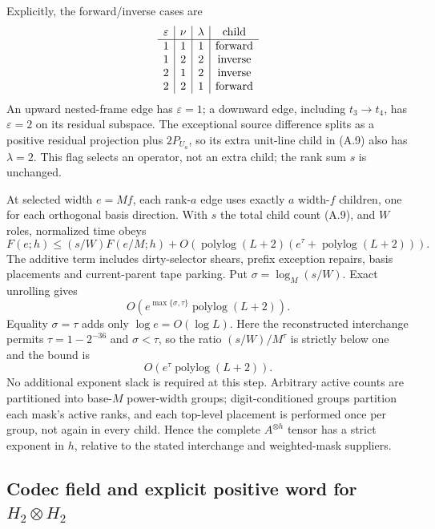 Explicitly, the forward/inverse cases are
\[
\begin{array}{c|c|c|c}
 \varepsilon&\nu&\lambda&\hbox{child}\\ \hline
 1&1&1&\hbox{forward}\\
 1&2&2&\hbox{inverse}\\
 2&1&2&\hbox{inverse}\\
 2&2&1&\hbox{forward}
\end{array}
\]
An upward nested-frame edge has $\varepsilon=1$; a downward edge,
including $t_3\to t_4$, has $\varepsilon=2$ on its residual subspace.
The exceptional source difference splits as a positive residual
projection plus $2P_{U_a}$, so its extra unit-line child in (A.9)
also has $\lambda=2$. This flag selects an operator, not an extra
child; the rank sum $s$ is unchanged.

At selected width $e=Mf$, each rank-$a$ edge uses exactly $a$ width-$f$
children, one for each orthogonal basis direction. With $s$ the total
child count (A.9), and $W$ roles, normalized time obeys
\[
 F(e;h)\le (s/W)F(e/M;h)
       +O\!\left(\operatorname{polylog}(L+2)
          (e^\tau+\operatorname{polylog}(L+2))\right).       \tag{A.16}
\]
The additive term includes dirty-selector shears, prefix exception
repairs, basis placements and current-parent tape parking. Put
$\sigma=\log_M(s/W)$. Exact unrolling gives
\[
 O(e^{\max\{\sigma,\tau\}}\operatorname{polylog}(L+2)).
\]
Equality $\sigma=\tau$ adds only $\log e=O(\log L)$. Here the
reconstructed interchange permits $\tau=1-2^{-36}$ and $\sigma<\tau$,
so the ratio $(s/W)/M^\tau$ is strictly below one and the bound is
\[
 O(e^\tau\operatorname{polylog}(L+2)).
\]
No additional exponent
slack is required at this step.
Arbitrary active counts are
partitioned into base-$M$ power-width groups; digit-conditioned groups
partition each mask's active ranks, and each top-level placement is
performed once per group, not again in every child. Hence the complete
$A^{\otimes h}$ tensor has a strict exponent in $h$, relative to the
stated interchange and weighted-mask suppliers.

\subsection{Codec field and explicit positive word for $H_2\otimes H_2$}

